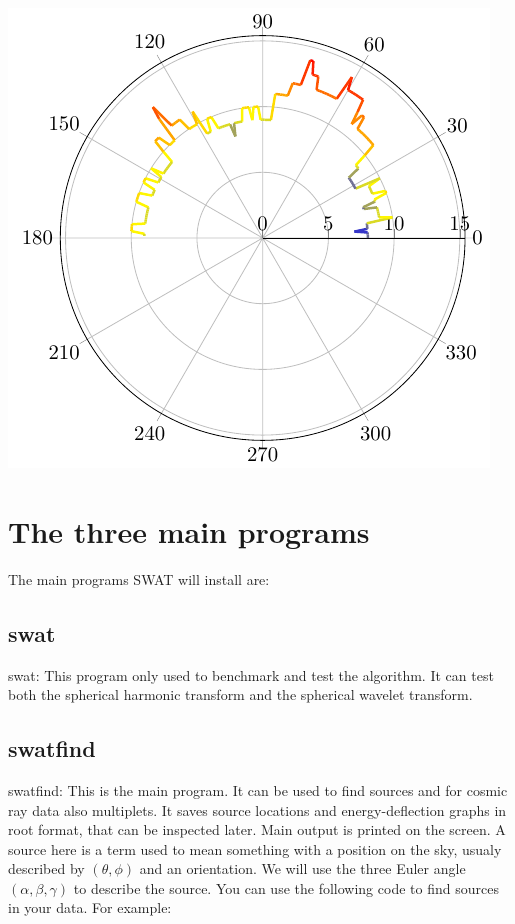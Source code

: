 \documentclass[12pt]{article}
\begin{document}
\includegraphics[scale=0.5]{multiplicity.pdf} \\ 

\section{The three main programs}
The main programs SWAT will install are:
\subsection{swat}
swat: This program only used to benchmark and test the algorithm. It can test
both the spherical harmonic transform and the spherical wavelet transform.
\subsection{swatfind}
swatfind: This is the main program. It can be used to find sources and for cosmic ray data
also multiplets. It saves source locations and energy-deflection graphs in root format, that can
be inspected later. Main output is printed on the screen.
A source here is a term used to mean something with a position on the sky, usualy described
by $(\theta,\phi)$ and an orientation. We will use the three Euler angle $(\alpha,\beta,\gamma)$ to
describe the source. You can use the following code to find sources in your data.
For example:
\end{document}
